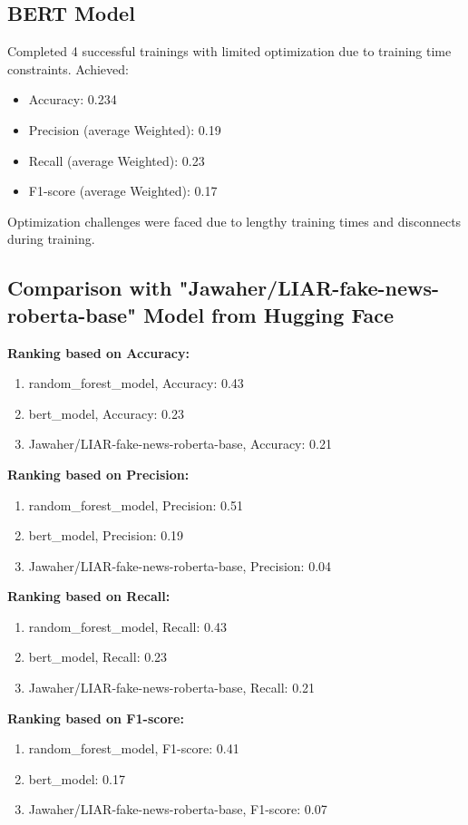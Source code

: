 \documentclass{article}
\begin{document}
\subsection*{BERT Model}
Completed 4 successful trainings with limited optimization due to training time constraints. Achieved:
\begin{itemize}
  \item Accuracy: 0.234
  \item Precision (average Weighted): 0.19
  \item Recall (average Weighted): 0.23
  \item F1-score (average Weighted): 0.17
\end{itemize}

Optimization challenges were faced due to lengthy training times and disconnects during training.

\subsection*{Comparison with "Jawaher/LIAR-fake-news-roberta-base" Model from Hugging Face}
\textbf{Ranking based on Accuracy:}
\begin{enumerate}
  \item random\_forest\_model, Accuracy: 0.43
  \item bert\_model, Accuracy: 0.23
  \item Jawaher/LIAR-fake-news-roberta-base, Accuracy: 0.21
\end{enumerate}

\textbf{Ranking based on Precision:}
\begin{enumerate}
  \item random\_forest\_model, Precision: 0.51
  \item bert\_model, Precision: 0.19
  \item Jawaher/LIAR-fake-news-roberta-base, Precision: 0.04
\end{enumerate}

\textbf{Ranking based on Recall:}
\begin{enumerate}
  \item random\_forest\_model, Recall: 0.43
  \item bert\_model, Recall: 0.23
  \item Jawaher/LIAR-fake-news-roberta-base, Recall: 0.21
\end{enumerate}

\textbf{Ranking based on F1-score:}
\begin{enumerate}
  \item random\_forest\_model, F1-score: 0.41
  \item bert\_model: 0.17
  \item Jawaher/LIAR-fake-news-roberta-base, F1-score: 0.07
\end{enumerate}
\end{document}
